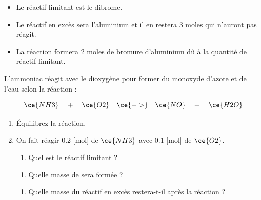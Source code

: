 \documentclass[
  11pt,
  a4paper,
  openany]{book}
\providecommand{\tightlist}{%
  \setlength{\itemsep}{0pt}\setlength{\parskip}{0pt}}
\begin{document}
\begin{itemize}
\tightlist
\item
  Le réactif limitant est le dibrome.
\item
  Le réactif en excès sera l'aluminium et il en restera 3 moles qui n'auront pas réagit.
\item
  La réaction formera 2 moles de bromure d'aluminium dû à la quantité de réactif limitant.
\end{itemize}

\begin{Exercise}

L'ammoniac réagit avec le dioxygène pour former du monoxyde d'azote et de l'eau selon la réaction :

\[ \ce{NH3} \quad + \quad \ce{O2} \quad \ce{->} \quad \ce{NO} \quad + \quad \ce{H2O} \]

\begin{enumerate}
\def\labelenumi{\arabic{enumi}.}
\item
  Équilibrez la réaction.
\item
  On fait réagir 0.2 {[}mol{]} de \(\ce{NH3}\) avec 0.1 {[}mol{]} de \(\ce{O2}\).

  \begin{enumerate}
  \def\labelenumii{\alph{enumii}.}
  \tightlist
  \item
    Quel est le réactif limitant ?
  \end{enumerate}


  \begin{enumerate}
  \def\labelenumii{\alph{enumii}.}
  \setcounter{enumii}{1}
  \tightlist
  \item
    Quelle masse de  sera formée ?
  \end{enumerate}


  \begin{enumerate}
  \def\labelenumii{\alph{enumii}.}
  \setcounter{enumii}{2}
  \tightlist
  \item
    Quelle masse du réactif en excès restera-t-il après la réaction ?
  \end{enumerate}

\end{enumerate}

\end{Exercise}
\end{document}
